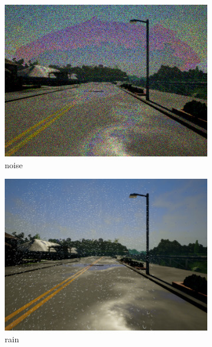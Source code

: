 \documentclass[14pt]{extarticle}
\begin{document}
\begin{figure}
\begin{subfigure}[b]{0.3\textwidth}
			 \includegraphics[scale=0.1]{./foto_sporcature/noise.png}
	         \caption{noise}
	         \label{fig:noise}
	     \end{subfigure}
	     \hfill
	     \begin{subfigure}[b]{0.3\textwidth}
	         \centering
			 \includegraphics[scale=0.1]{./foto_sporcature/rain.png}
	         \caption{rain}
	         \label{fig:rain}
	     \end{subfigure}
	        \hfill
	     \begin{subfigure}[b]{0.3\textwidth}
	         \centering

\end{subfigure}
\end{figure}
\end{document}
